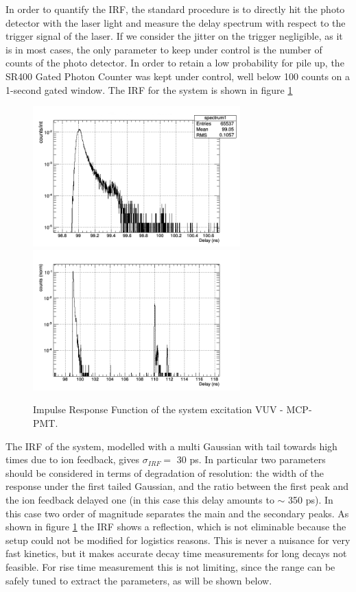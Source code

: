 In order to quantify the IRF, the standard procedure is to directly hit the photo detector with the laser light and measure the delay spectrum with respect to the trigger signal of the laser.
If we consider the jitter on the trigger negligible, as it is in most cases, the only parameter to keep under control is the number of counts of the photo detector. 
In order to retain a low probability for pile up, the SR400 Gated Photon Counter was kept under control, well below 100 counts on a 1-second gated window. 
The IRF for the system is shown in figure \ref{fig:IRF}
\begin{figure}[htbp]
\begin{center}
\includegraphics[width=8cm]{../Pictures/Chapter_7/IRF_simple.png}
\includegraphics[width=8cm]{../Pictures/Chapter_7/long.png}
\end{center}
\caption[VUV setup IRF]{Impulse Response Function of the system excitation VUV - MCP-PMT.}
\label{fig:IRF}
\end{figure}
The IRF of the system, modelled with a multi Gaussian with tail towards high times due to ion feedback, gives $\sigma _{IRF} = $ 30 ps.
In particular two parameters should be considered in terms of degradation of resolution: the width of the response under the first tailed Gaussian, and the ratio between the first peak and the ion feedback delayed one (in this case this delay amounts to $\sim$ 350 ps). In this case two order of magnitude separates the main and the secondary peaks.
As shown in figure \ref{fig:IRF} the IRF shows a reflection, which is not eliminable because the setup could not be modified for logistics reasons. This is never a nuisance for very fast kinetics, but it makes accurate decay time measurements for long decays not feasible. For rise time measurement this is not limiting, since the range can be safely tuned to extract the parameters, as will be shown below. 


